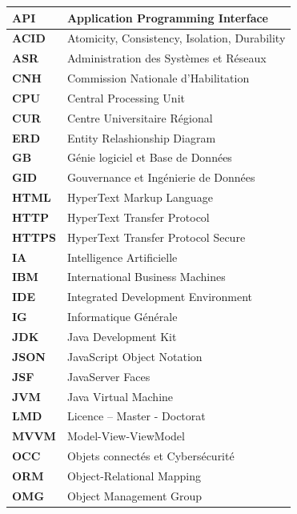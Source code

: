 \documentclass[12pt]{report}
\begin{document}
			\begin{longtable}{|p{4cm}|p{10cm}|} 
			\hline
				\textbf{API} & Application Programming Interface\\
			\hline
				\textbf{ACID} & Atomicity, Consistency, Isolation, Durability\\
			\hline
				\textbf{ASR} & Administration des Systèmes et Réseaux\\
			\hline
				\textbf{CNH} & Commission Nationale d’Habilitation\\
			\hline
				\textbf{CPU} & Central Processing Unit\\
			\hline
				\textbf{CUR} & Centre Universitaire Régional\\
			\hline
				\textbf{ERD} & Entity Relashionship Diagram\\
			\hline
				\textbf{GB} & Génie logiciel et Base de Données\\
			\hline
				\textbf{GID} & Gouvernance et Ingénierie de Données\\
			\hline
				\textbf{HTML} & HyperText Markup Language\\
			\hline
				\textbf{HTTP} & HyperText Transfer Protocol\\
			\hline
				\textbf{HTTPS} & HyperText Transfer Protocol Secure\\
			\hline
				\textbf{IA} & Intelligence Artificielle\\
			\hline
				\textbf{IBM} & International Business Machines\\
			\hline
				\textbf{IDE} & Integrated Development Environment\\
			\hline
				\textbf{IG} & Informatique Générale\\
			\hline
				\textbf{JDK} & Java Development Kit\\
			\hline
				\textbf{JSON} & JavaScript Object Notation\\
			\hline
				\textbf{JSF} & JavaServer Faces\\
			\hline
				\textbf{JVM} & Java Virtual Machine\\
			\hline
				\textbf{LMD} & Licence – Master - Doctorat\\
			\hline
				\textbf{MVVM} & Model-View-ViewModel\\
			\hline
				\textbf{OCC} & Objets connectés et Cybersécurité\\
			\hline
				\textbf{ORM} & Object-Relational Mapping\\
			\hline
				\textbf{OMG} & Object Management Group\\
			\hline

\end{longtable}
\end{document}
